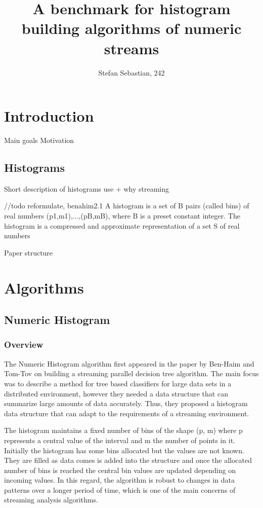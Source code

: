 \documentclass[12pt]{article}
\begin{document}
	\title{A benchmark for histogram building algorithms of numeric streams}
	\author{Stefan Sebastian, 242}
	\date{}
	\maketitle
	
	\newpage
	\tableofcontents
	\newpage

	\section{Introduction}
	Main goals 
	Motivation 

	\subsection{Histograms}
	Short description of histograms use + why streaming 
	
	//todo reformulate, benahim2.1 A histogram is a set of B pairs (called bins) of real numbers {(p1,m1),...,(pB,mB)}, where B is a
	preset constant integer. The histogram is a compressed and approximate representation of a set S
	of real numbers


	Paper structure

	\section{Algorithms}
	\subsection{Numeric Histogram}
	\subsubsection{Overview}
	The Numeric Histogram algorithm first appeared in the paper by Ben-Haim and Tom-Tov
	on building a streaming parallel decision tree algorithm\cite{Ben-Haim:2010:SPD:1756006.1756034}.
	The main focus was to describe a method for tree based classifiers for large data 
	sets in a distributed environment, however they needed a data structure that 
	can summarize large amounts of data accurately. Thus, they proposed a histogram 
	data structure that can adapt to the requirements of a streaming environment. 

	The histogram maintains a fixed number of bins of the shape (p, m) where 
	p represents a central value of the interval and m the number of points in it.
	Initially the histogram has some bins allocated but the values are not known. 
	They are filled as data comes is added into the structure and once the allocated 
	number of bins is reached the central bin values are updated depending on incoming
	values. In this regard, the algorithm is robust to changes in data patterns over 
	a longer period of time, which is one of the main concerns of streaming analysis 
	algorithms.
\end{document}
